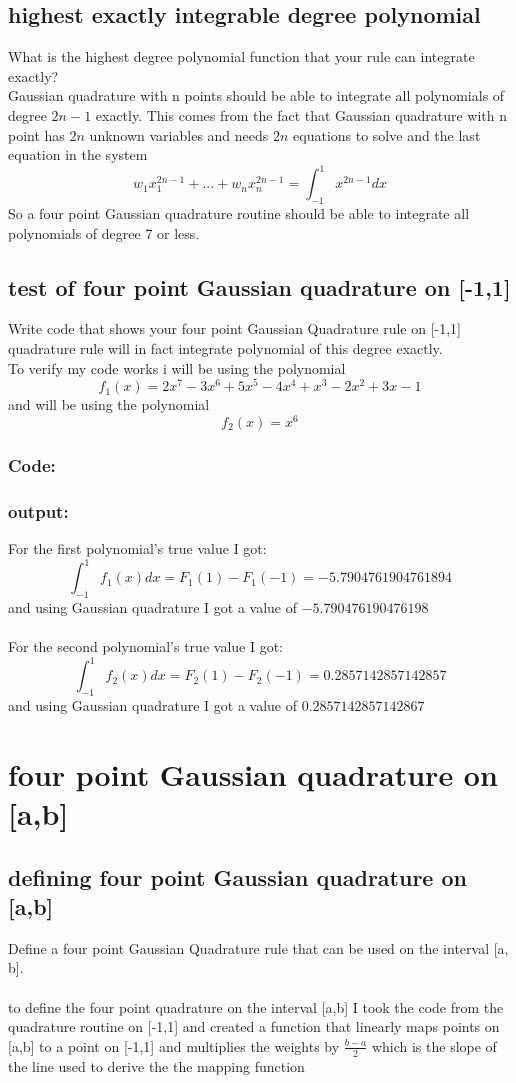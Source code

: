 \documentclass{article}
\begin{document}
\subsection{highest exactly integrable degree polynomial}
	What is the highest degree polynomial function that your rule can integrate exactly?
	\\Gaussian quadrature with n points should be able to integrate all polynomials of degree $2n-1$ exactly. This comes from the fact that Gaussian quadrature with n point has $2n$ unknown variables and needs $2n$ equations to solve and the last equation in the system  $$ w_1x_1^{2n-1} + ... +w_nx_n^{2n-1} = \int_{-1}^{1}x^{2n-1}dx$$ So a four point Gaussian quadrature routine should be able to integrate all polynomials of degree 7 or less.  
\subsection{test of four point Gaussian quadrature on [-1,1]}
	Write code that shows your four point Gaussian Quadrature rule on [-1,1] quadrature rule will in fact integrate polynomial of this degree exactly.
	\\To verify my code works i will be using the polynomial $$f_1(x)=2x^7 - 3x^6 + 5x^5 - 4x^4 + x^3 - 2x^2 + 3x - 1$$ and will be using the polynomial $$f_2(x)= x^6 $$
	\subsubsection*{Code:}
		
	\subsubsection*{output:}
		For the first polynomial's true value I got:$$\int_{-1}^{1}f_1(x)dx= F_1(1)-F_1(-1)=-5.7904761904761894$$ 
		and using Gaussian quadrature I got a value of $-5.790476190476198$ \\\\
		For the second polynomial's true value I got:$$\int_{-1}^{1}f_2(x)dx= F_2(1)-F_2(-1)=0.2857142857142857$$ 
		and using Gaussian quadrature I got a value of $0.2857142857142867$ \\
\section{four point Gaussian quadrature on [a,b]}
	\subsection{defining four point Gaussian quadrature on [a,b]}
		Define a four point Gaussian Quadrature rule that can be used on the interval [a, b].\\\\
		to define the four point quadrature on the interval [a,b] I took the code from the quadrature routine on [-1,1] and created a function that linearly maps points on [a,b] to a point on [-1,1] and multiplies the weights by $\frac{b-a}{2}$ which is the slope of the line used to derive the the mapping function
\end{document}
